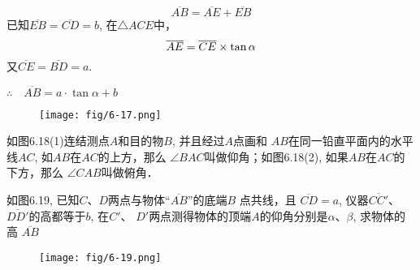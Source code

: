 \begin{solution}
\[\overline{AB}=\overline{AE}+\overline{EB}\]
已知$\overline{EB}=\overline{CD}=b$, 在$\triangle ACE$中，
\[\overline{AE}=\overline{CE}\times\tan\alpha\]
又$\overline{CE}=\overline{BD}=a$.

$\therefore\quad \overline{AB}=a\cdot \tan\alpha+b$
\end{solution}

\begin{figure}[htp]\centering
    \begin{minipage}[t]{0.48\textwidth}
    \centering
\texttt{[image: fig/6-17.png]}
    \caption{}
    \end{minipage}
    \begin{minipage}[t]{0.48\textwidth}
    \centering
    \caption{}
    \end{minipage}
    \end{figure}

\begin{rmk}
    如图6.18(1)连结测点$A$和目的物$B$, 并且经过$A$点画和
$AB$在同一铅直平面内的水平线$AC$, 如$AB$在$AC$的上方，那么
$\angle BAC$叫做仰角；如图6.18(2), 如果$AB$在$AC$的下方，那么
$\angle CAB$叫做俯角．
\end{rmk}  


\begin{example}
    如图6.19, 已知$C$、$D$两点与物体“$\overline{AB}$”的底端$B$
点共线，且
$\overline{CD}=a$, 仪器$\overline{CC'}$、$\overline{DD'}$的高都等于$b$, 在$C'$、
$D'$两点测得物体的顶端$A$的仰角分别是$\alpha$、$\beta$, 求物体的高
$\overline{AB}$
\end{example}

\begin{figure}[htp]\centering
    \begin{minipage}[t]{0.48\textwidth}
    \centering
    \texttt{[image: fig/6-19.png]}
    \caption{}
    \end{minipage}
    \begin{minipage}[t]{0.48\textwidth}
    \centering
    \caption{}
    \end{minipage}
    \end{figure}


